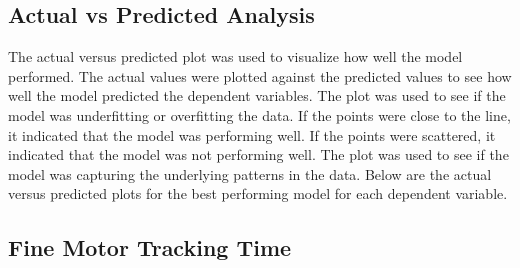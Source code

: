\subsection{Actual vs Predicted Analysis}
The actual versus predicted plot was used to visualize how well the model performed. The actual values were plotted against the predicted values to see how well the model predicted the
dependent variables. The plot was used to see if the model was underfitting or overfitting the data. If the points were close to the line, it indicated that the model was performing well.
If the points were scattered, it indicated that the model was not performing well. The plot was used to see if the model was capturing the underlying patterns in the data. Below are the 
actual versus predicted plots for the best performing model for each dependent variable.

\subsection*{Fine Motor Tracking Time}

